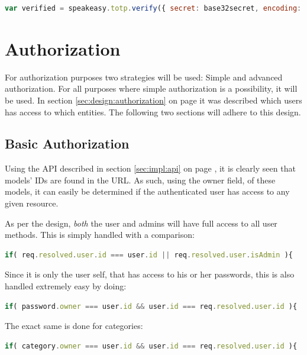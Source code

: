 			\begin{lstlisting}[gobble=16,language=JavaScript,caption={Verifying a TOTP token using Speakeasy},label={lst:example:speakeasy:verification}]
                var verified = speakeasy.totp.verify({ secret: base32secret, encoding: 'base32', token: userToken });
			\end{lstlisting}

	\section{Authorization}
		\label{sec:impl:authorization}
		For authorization purposes two strategies will be used: Simple and advanced authorization. For all purposes where simple authorization is a possibility, it will be used. In section \ref{sec:design:authorization} on page \pageref{sec:design:authorization} it was described which users has access to which entities. The following two sections will adhere to this design.

		\subsection{Basic Authorization}
			Using the API described in section \ref{sec:impl:api} on page \pageref{sec:impl:api}, it is clearly seen that models' IDs are found in the URL. As such, using the owner field, of these models, it can easily be determined if the authenticated user has access to any given resource.

			As per the design, \emph{both} the user and admins will have full access to all user methods. This is simply handled with a comparison:
			\begin{lstlisting}[gobble=16,language=JavaScript]
                if( req.resolved.user.id === user.id || req.resolved.user.isAdmin ){
			\end{lstlisting}

			Since it is only the user self, that has access to his or her passwords, this is also handled extremely easy by doing:
			\begin{lstlisting}[gobble=16,language=JavaScript]
                if( password.owner === user.id && user.id === req.resolved.user.id ){
			\end{lstlisting}
			The exact same is done for categories:
			\begin{lstlisting}[gobble=16,language=JavaScript]
                if( category.owner === user.id && user.id === req.resolved.user.id ){
			\end{lstlisting}

